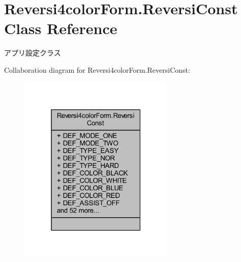 \hypertarget{class_reversi4color_form_1_1_reversi_const}{}\section{Reversi4color\+Form.\+Reversi\+Const Class Reference}
\label{class_reversi4color_form_1_1_reversi_const}


アプリ設定クラス  




Collaboration diagram for Reversi4color\+Form.\+Reversi\+Const\+:\nopagebreak
\begin{figure}[H]
\begin{center}
\leavevmode
\includegraphics[width=211pt]{class_reversi4color_form_1_1_reversi_const__coll__graph}
\end{center}
\end{figure}
